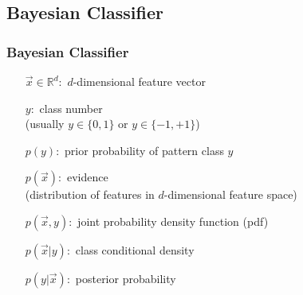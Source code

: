 \subsection{Bayesian Classifier}

\begin{frame}
	\frametitle{Bayesian Classifier}


	\begin{center}
		\begin{minipage}{0.7\textwidth}
			\begin{itemize}
				\item[ $ \vec x \in \mathbb{R}^d:$]  $d$-dimensional feature vector
				\item[ $y:$] class number \\
				      (usually $y\in\{0,1\}$ or $y\in\{-1,+1\}$)
				\item[$p(y):$] prior probability of pattern class $y$
				\item[$p(\vec x):$] evidence\\
				      (distribution of features in $d$-dimensional feature space)
				\item[$p(\vec x , y):$] joint probability density function (pdf)
				\item[$p(\vec x |y):$] class conditional density
				\item[$p(y| \vec x):$] posterior probability
			\end{itemize}
		\end{minipage}
	\end{center}
\end{frame}


